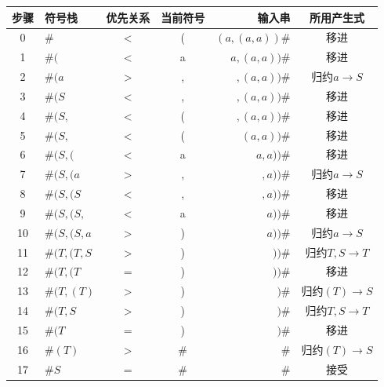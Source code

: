 \documentclass{article}
\begin{document}
\begin{center}
    \begin{longtable}{|c|l|c|c|r|c|}\hline
        步骤 & 符号栈      & 优先关系 & 当前符号 & 输入串        & 所用产生式             \\\hline
        0    & $\#$        & <        & (        & $(a,(a,a))\#$ & 移进                   \\\hline
        1    & $\#($       & <        & a        & $a,(a,a))\#$  & 移进                   \\\hline
        2    & $\#(a$      & >        & ,        & $,(a,a))\#$   & 归约$a\rightarrow S$   \\\hline
        3    & $\#(S$      & <        & ,        & $,(a,a))\#$   & 移进                   \\\hline
        4    & $\#(S,$     & <        & (        & $,(a,a))\#$   & 移进                   \\\hline
        5    & $\#(S,$     & <        & (        & $(a,a))\#$    & 移进                   \\\hline
        6    & $\#(S,($    & <        & a        & $a,a))\#$     & 移进                   \\\hline
        7    & $\#(S,(a$   & >        & ,        & $,a))\#$      & 归约$a\rightarrow S$   \\\hline
        8    & $\#(S,(S$   & <        & ,        & $,a))\#$      & 移进                   \\\hline
        9    & $\#(S,(S,$  & <        & a        & $a))\#$       & 移进                   \\\hline
        10   & $\#(S,(S,a$ & >        & )        & $a))\#$       & 归约$a\rightarrow S$   \\\hline
        11   & $\#(T,(T,S$ & >        & )        & $))\#$        & 归约$T,S\rightarrow T$ \\\hline
        12   & $\#(T,(T$   & =        & )        & $))\#$        & 移进                   \\\hline
        13   & $\#(T,(T)$  & >        & )        & $)\#$         & 归约$(T)\rightarrow S$ \\\hline
        14   & $\#(T,S$    & >        & )        & $)\#$         & 归约$T,S\rightarrow T$ \\\hline
        15   & $\#(T$      & =        & )        & $)\#$         & 移进                   \\\hline
        16   & $\#(T)$     & >        & $\#$     & $\#$          & 归约$(T)\rightarrow S$ \\\hline
        17   & $\#S$       & =        & $\#$     & $\#$          & 接受                   \\\hline
    \end{longtable}
\end{center}
\newpage
\end{document}
